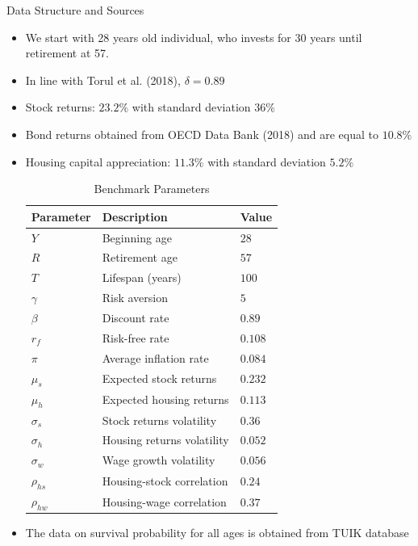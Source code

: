 \documentclass{beamer}
\begin{document}
\begin{frame}[allowframebreaks]{Data Structure and Sources}
\begin{itemize}
\framebreak

	\item We start with 28 years old individual, who invests for 30 years until retirement at 57.
	\item In line with Torul et al. (2018), $\delta = 0.89$
	\item Stock returns: $23.2\%$ with standard deviation $36\%$
	\item Bond returns obtained from OECD Data Bank (2018) and are equal to $10.8\%$
	\item Housing capital appreciation: $11.3\%$ with standard deviation $5.2\%$

\framebreak

\begin{table}
	\centering
	\caption{Benchmark Parameters}
	\begin{tabular}[c]{lll}
		\hline
		Parameter&Description&Value\\
		\hline
		$Y$&Beginning age&$28$\\
		$R$&Retirement age&$57$\\
		$T$&Lifespan (years)&$100$\\
		$\gamma$&Risk aversion&$5$\\
		$\beta$&Discount rate&$0.89$\\
		$r_f$&Risk-free rate&$0.108$\\
		$\pi$&Average inflation rate&$0.084$\\
		\hline
		$\mu_s$&Expected stock returns&$0.232$\\
		$\mu_h$&Expected housing returns&$0.113$\\
		$\sigma_s$&Stock returns volatility&$0.36$\\
		$\sigma_h$&Housing returns volatility&$0.052$\\
		$\sigma_w$&Wage growth volatility&$0.056$\\
		$\rho_{hs}$&Housing-stock correlation&$0.24$\\
		$\rho_{hw}$&Housing-wage correlation&$0.37$\\
		\hline
	\end{tabular}
\end{table}

\framebreak 
	\item The data on survival probability for all ages is obtained from TUIK database


\end{itemize}
\end{frame}
\end{document}
